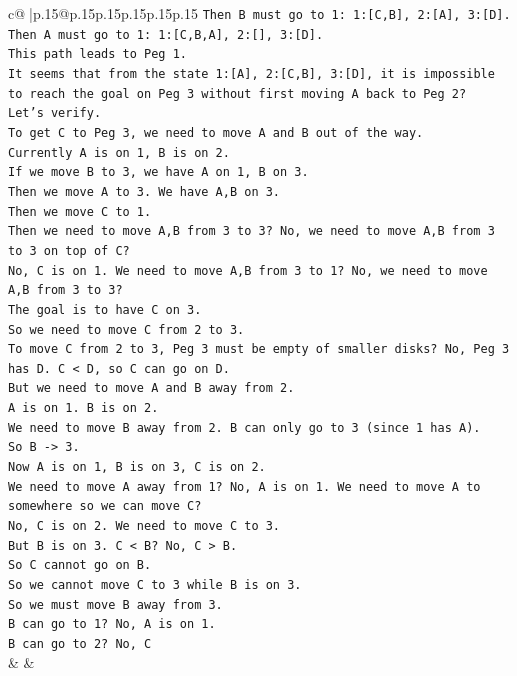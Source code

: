 \documentclass{article}
\begin{document}
{\begin{supertabular}{c@{$\;$}|p{.15\linewidth}@{}p{.15\linewidth}p{.15\linewidth}p{.15\linewidth}p{.15\linewidth}p{.15\linewidth}}
{{{\texttt{Then B must go to 1: 1:{[}C,B{]}, 2:{[}A{]}, 3:{[}D{]}.} \\
\texttt{Then A must go to 1: 1:{[}C,B,A{]}, 2:{[}{]}, 3:{[}D{]}.} \\
\texttt{This path leads to Peg 1.} \\
\texttt{It seems that from the state 1:{[}A{]}, 2:{[}C,B{]}, 3:{[}D{]}, it is impossible to reach the goal on Peg 3 without first moving A back to Peg 2?} \\
\texttt{Let's verify.} \\
\texttt{To get C to Peg 3, we need to move A and B out of the way.} \\
\texttt{Currently A is on 1, B is on 2.} \\
\texttt{If we move B to 3, we have A on 1, B on 3.} \\
\texttt{Then we move A to 3. We have A,B on 3.} \\
\texttt{Then we move C to 1.} \\
\texttt{Then we need to move A,B from 3 to 3? No, we need to move A,B from 3 to 3 on top of C?} \\
\texttt{No, C is on 1. We need to move A,B from 3 to 1? No, we need to move A,B from 3 to 3?} \\
\texttt{The goal is to have C on 3.} \\
\texttt{So we need to move C from 2 to 3.} \\
\texttt{To move C from 2 to 3, Peg 3 must be empty of smaller disks? No, Peg 3 has D. C < D, so C can go on D.} \\
\texttt{But we need to move A and B away from 2.} \\
\texttt{A is on 1. B is on 2.} \\
\texttt{We need to move B away from 2. B can only go to 3 (since 1 has A).} \\
\texttt{So B {-}> 3.} \\
\texttt{Now A is on 1, B is on 3, C is on 2.} \\
\texttt{We need to move A away from 1? No, A is on 1. We need to move A to somewhere so we can move C?} \\
\texttt{No, C is on 2. We need to move C to 3.} \\
\texttt{But B is on 3. C < B? No, C > B.} \\
\texttt{So C cannot go on B.} \\
\texttt{So we cannot move C to 3 while B is on 3.} \\
\texttt{So we must move B away from 3.} \\
\texttt{B can go to 1? No, A is on 1.} \\
\texttt{B can go to 2? No, C} \\
            }
        }
    }
    & & \\ \\


\end{supertabular}}
\end{document}
